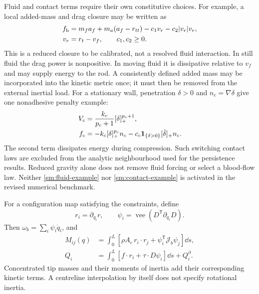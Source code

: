 Fluid and contact terms require their own constitutive choices. For
example, a local added-mass and drag closure may be written as
\begin{align}
 f_{\rm h}&=m_f a_f+m_a(a_f-r_{tt})
                  -c_1v_r-c_2|v_r|v_r,\nonumber\\
 v_r&=r_t-v_f,\qquad c_1,c_2\ge0.
 \label{sm:fluid-example}
\end{align}
This is a reduced closure to be calibrated, not a resolved fluid
interaction. In still fluid the drag power is nonpositive. In moving
fluid it is dissipative relative to $v_f$ and may supply energy to the
rod. A consistently defined added mass may be incorporated into the
kinetic metric once; it must then be removed from the external inertial
load. For a stationary wall, penetration $\delta>0$ and
$n_c=\nabla\delta$ give one nonadhesive penalty example:
\begin{align}
 V_c&=\frac{k_c}{p_c+1}[\delta]_+^{p_c+1},\nonumber\\
 f_c&=-k_c[\delta]_+^{p_c}n_c
       -c_c{\bf1}_{\{\delta>0\}}[\dot\delta]_+n_c.
 \label{sm:contact-example}
\end{align}
The second term dissipates energy during compression. Such switching
contact laws are excluded from the analytic neighbourhood used for the
persistence results. Reduced gravity alone does not remove fluid
forcing or select a blood-flow law. Neither
\eqref{sm:fluid-example} nor \eqref{sm:contact-example} is activated in
the revised numerical benchmark.

For a configuration map satisfying the constraints, define
\begin{equation}
 r_i=\partial_{q_i}r,\qquad
 \psi_i=\operatorname{vee}(D^{\mathsf T}\partial_{q_i}D).
 \label{sm:configuration-derivatives}
\end{equation}
Then $\omega_b=\sum_i\psi_i\dot q_i$, and
\begin{align}
 M_{ij}(q)&=\int_0^L
     [\rho A_c\,r_i\cdot r_j+\psi_i^{\mathsf T}\mathcal J_b\psi_j]\dd s,
       \nonumber\\
 Q_i&=\int_0^L[f\cdot r_i+\tau\cdot D\psi_i]\dd s+Q_i^\partial.
 \label{sm:galerkin-metric}
\end{align}
Concentrated tip masses and their moments of inertia add their
corresponding kinetic terms. A centreline interpolation by itself does
not specify rotational inertia.

